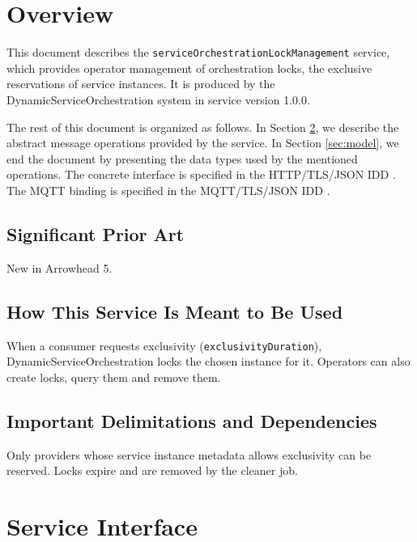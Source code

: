 \documentclass[a4paper]{arrowhead}
\begin{document}
\section{Overview}
\label{sec:overview}

This document describes the \texttt{service\allowbreak{}Orchestration\allowbreak{}Lock\allowbreak{}Management} service, which provides operator management of orchestration locks, the exclusive reservations of service instances.
It is produced by the DynamicServiceOrchestration system \cite{dso-sysd} in service version 1.0.0.

The rest of this document is organized as follows.
In Section \ref{sec:operations}, we describe the abstract message operations provided by the service.
In Section \ref{sec:model}, we end the document by presenting the data types used by the mentioned operations.
The concrete interface is specified in the HTTP/TLS/JSON IDD \cite{dso-serviceOrchestrationLockManagement-http-idd}. The MQTT binding is specified in the MQTT/TLS/JSON IDD \cite{dso-serviceOrchestrationLockManagement-mqtt-idd}.

\subsection{Significant Prior Art}

New in Arrowhead 5.

\subsection{How This Service Is Meant to Be Used}

When a consumer requests exclusivity (\texttt{exclusivity\allowbreak{}Duration}), Dynamic\allowbreak{}Service\allowbreak{}Orchestration locks the chosen instance for it. Operators can also create locks, query them and remove them.

\subsection{Important Delimitations and Dependencies}
\label{sec:delimitations}

Only providers whose service instance metadata allows exclusivity can be reserved. Locks expire and are removed by the cleaner job.

\newpage

\section{Service Interface}
\label{sec:operations}
\end{document}
